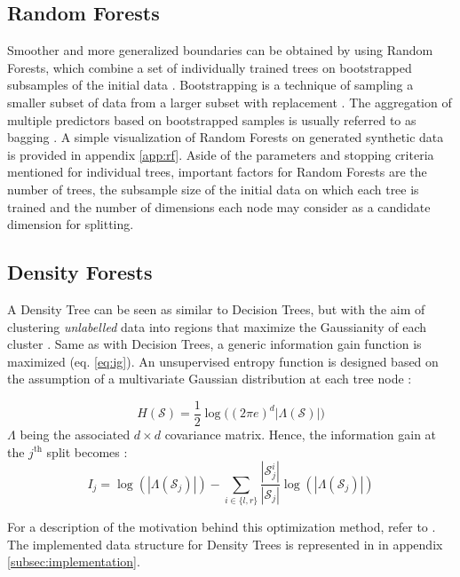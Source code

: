 \documentclass[10pt]{article}
\begin{document}
\subsection{Random Forests}
Smoother and more generalized boundaries can be obtained by using Random Forests, which combine a set of individually trained trees on bootstrapped subsamples of the initial data \cite{decisionForests-MSR, Breiman2001}. Bootstrapping is a technique of sampling a smaller subset of data from a larger subset with replacement \cite{Zoubir2007BootstrapMA}. The aggregation of multiple predictors based on bootstrapped samples is usually referred to as bagging \cite{Breiman1996BaggingP}. A simple visualization of Random Forests on generated synthetic data is provided in appendix \ref{app:rf}. Aside of the parameters and stopping criteria mentioned for individual trees, important factors for Random Forests are the number of trees, the subsample size of the initial data on which each tree is trained and the number of dimensions each node may consider as a candidate dimension for splitting.

\subsection{Density Forests}

A Density Tree can be seen as similar to Decision Trees, but with the aim of clustering \textit{unlabelled} data into regions that maximize the Gaussianity of each cluster \cite{CW2017}. Same as with Decision Trees, a generic information gain function is maximized (eq. \ref{eq:ig}). An unsupervised entropy function is designed based on the assumption of a multivariate Gaussian distribution at each tree node \cite{decisionForests-MSR}:

\begin{equation}
    H(\mathcal{S}) = \frac{1}{2}\log\Big((2\pi e)^d|\mathtt{\Lambda}(\mathcal{S})|\Big)
\end{equation}
$\mathtt{\Lambda}$ being the associated $d \times d$ covariance matrix. Hence, the information gain at the $j^{\text{th}}$ split becomes \cite{decisionForests-MSR}:
\begin{equation}
    I_j = \log(|\mathtt{\Lambda}(\mathcal{S}_j)|) - \sum_{i\in \{l, r\}}\frac{|\mathcal{S}_j^i|}{|\mathcal{S}_j|}\log(|\mathtt{\Lambda}(\mathcal{S}_j)|)
\end{equation}

For a description of the motivation behind this optimization method, refer to \cite{decisionForests-MSR}. The implemented data structure for Density Trees is represented in in appendix \ref{subsec:implementation}.
\end{document}
